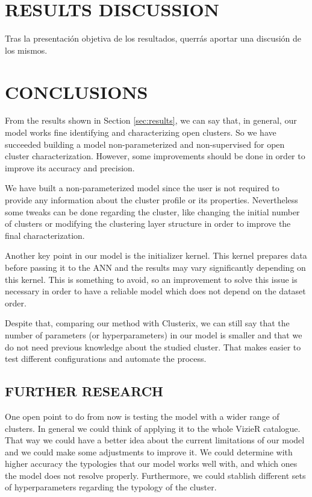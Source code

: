 \documentclass[11pt,a4paper,english,twocolumn]{article}
\begin{document}
\section{RESULTS DISCUSSION}

Tras la presentación objetiva de los resultados, querrás aportar una discusión de los mismos.

\section{CONCLUSIONS}

From the results shown in Section \ref{sec:results}, we can say that, in general,
our model works fine identifying and characterizing open clusters.
So we have succeeded building a model non-parameterized and non-supervised
for open cluster characterization. However, some improvements should be done
in order to improve its accuracy and precision.

We have built a non-parameterized model since the user is not required to provide
any information about the cluster profile or its properties.
Nevertheless some tweaks can be done regarding the cluster, like changing the initial
number of clusters or modifying the clustering layer structure in order to improve
the final characterization.

Another key point in our model is the initializer kernel.
This kernel prepares data before passing it to the ANN
and the results may vary significantly depending on this kernel.
This is something to avoid, so an improvement to solve this issue is necessary
in order to have a reliable model which does not depend on the dataset order.

Despite that, comparing our method with Clusterix, we can still say that the
number of parameters (or hyperparameters) in our model is smaller and that
we do not need previous knowledge about the studied cluster.
That makes easier to test different configurations and automate the process.

\subsection{FURTHER RESEARCH}

One open point to do from now is testing the model with a wider range of clusters.
In general we could think of applying it to the whole VizieR catalogue.
That way we could have a better idea about the current limitations of our model
and we could make some adjustments to improve it. We could determine with higher
accuracy the typologies that our model works well with, and which ones the model
does not resolve properly. Furthermore, we could stablish different sets of
hyperparameters regarding the typology of the cluster.
\end{document}
